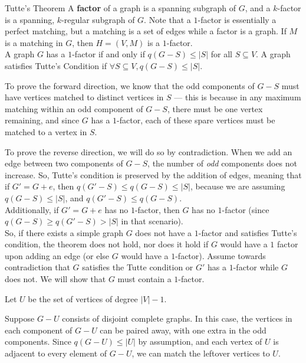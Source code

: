 \documentclass[10pt]{extarticle}
\begin{document}
  \begin{problem}{Tutte's Theorem}
    A \textbf{factor} of a graph is a spanning subgraph of $G$, and a $k$-factor is a spanning, $k$-regular subgraph of $G$. Note that a $1$-factor is essentially a perfect matching, but a matching is a set of edges while a factor is a graph. If $M$ is a matching in $G$, then $H = (V,M)$ is a $1$-factor.\\

    A graph $G$ has a $1$-factor if and only if $q(G-S) \leq |S|$ for all $S\subseteq V$. A graph satisfies Tutte's Condition if $\forall S\subseteq V, q(G-S) \leq |S|$.
    \tcblower
    \begin{description}[font=\normalfont\scshape]
      \item[($\Rightarrow$)] To prove the forward direction, we know that the odd components of $G-S$ must have vertices matched to distinct vertices in $S$ --- this is because in any maximum matching within an odd component of $G-S$, there must be one vertex remaining, and since $G$ has a $1$-factor, each of these spare vertices must be matched to a vertex in $S$.\\
      \item[($\Leftarrow$)] To prove the reverse direction, we will do so by contradiction. When we add an edge between two components of $G-S$, the number of \textit{odd} components does not increase. So, Tutte's condition is preserved by the addition of edges, meaning that if $G' = G + e$, then $q(G'-S) \leq q(G-S) \leq |S|$, because we are assuming $q(G-S) \leq |S|$, and $q(G'-S) \leq q(G-S)$.\\

        Additionally, if $G' = G + e$ has no $1$-factor, then $G$ has no $1$-factor (since $q(G-S) \geq q(G'-S) > |S|$ in that scenario).\\

        So, if there exists a simple graph $G$ does not have a $1$-factor and satisfies Tutte's condition, the theorem does not hold, nor does it hold if $G$ would have a $1$ factor upon adding an edge (or else $G$ would have a $1$-factor). Assume towards contradiction that $G$ satisfies the Tutte condition or $G'$ has a $1$-factor while $G$ does not. We will show that $G$ must contain a $1$-factor.

        Let $U$ be the set of vertices of degree $|V|-1$.
        \begin{description}[font=\normalfont\scshape]
          \item[Case 1] Suppose $G-U$ consists of disjoint complete graphs. In this case, the vertices in each component of $G-U$ can be paired away, with one extra in the odd components. Since $q(G-U) \leq |U|$ by assumption, and each vertex of $U$ is adjacent to every element of $G-U$, we can match the leftover vertices to $U$.\\


\end{description}
\end{description}
\end{problem}
\end{document}
